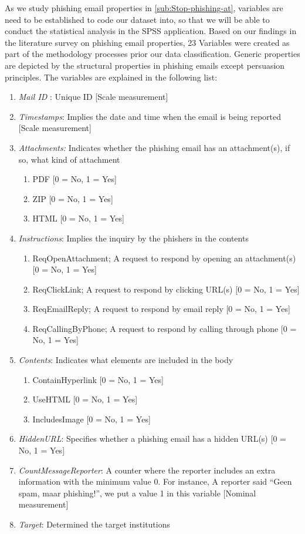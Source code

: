 As we study phishing email properties in \autoref{sub:Stop-phishing-at},
variables are need to be established to code our dataset into, so
that we will be able to conduct the statistical analysis in the SPSS
application. Based on our findings in the literature survey on phishing
email properties, 23 Variables were created as part of the methodology
processes prior our data classification. Generic properties are depicted
by the structural properties in phishing emails except persuasion
principles. The variables are explained in the following list:
\begin{enumerate}
\item \emph{Mail ID} : Unique ID {[}Scale measurement{]}
\item \emph{Timestamps}: Implies the date and time when the email is being
reported {[}Scale measurement{]}
\item \emph{Attachments:} Indicates whether the phishing email has an attachment(s),
if so, what kind of attachment

\begin{enumerate}
\item PDF {[}0 = No, 1 = Yes{]}
\item ZIP {[}0 = No, 1 = Yes{]}
\item HTML {[}0 = No, 1 = Yes{]}
\end{enumerate}
\item \textit{Instructions}: Implies the inquiry by the phishers in the
contents

\begin{enumerate}
\item ReqOpenAttachment; A request to respond by opening an attachment(s)
{[}0 = No, 1 = Yes{]}
\item ReqClickLink; A request to respond by clicking URL(s) {[}0 = No, 1
= Yes{]}
\item ReqEmailReply; A request to respond by email reply {[}0 = No, 1 =
Yes{]}
\item ReqCallingByPhone; A request to respond by calling through phone {[}0
= No, 1 = Yes{]}
\end{enumerate}
\item \emph{Contents}: Indicates what elements are included in the body

\begin{enumerate}
\item ContainHyperlink {[}0 = No, 1 = Yes{]}
\item UseHTML {[}0 = No, 1 = Yes{]}
\item IncludesImage {[}0 = No, 1 = Yes{]}
\end{enumerate}
\item \emph{HiddenURL}: Specifies whether a phishing email has a hidden
URL(s) {[}0 = No, 1 = Yes{]}
\item \emph{CountMessageReporter}: A counter where the reporter includes
an extra information with the minimum value 0. For instance, A reporter
said ``Geen spam, maar phishing!'', we put a value 1 in this variable
{[}Nominal measurement{]}
\item \emph{Target}: Determined the target institutions


\end{enumerate}

